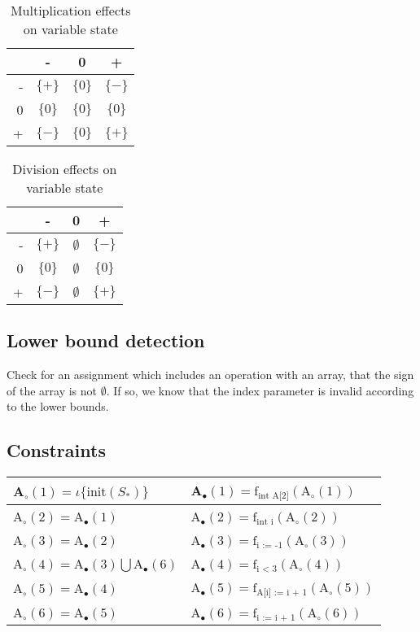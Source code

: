 \begin{table}[H]
\begin{tabular}{| r | c | c | c |}
\hline
    & -           & 0 & + \\
\hline
 -  & $\{+\}$ & $\{0\}$ & $\{-\}$ \\
\hline
 0  & $\{0\}$ & $\{0\}$ & $\{0\}$ \\
\hline
 +  & $\{-\}$ & $\{0\}$ & $\{+\}$ \\
\hline
\end{tabular}
\centering
\caption{Multiplication effects on variable state}
\end{table}

\begin{table}[H]
\begin{tabular}{| r | c | c | c |}
\hline
    & -           & 0 & + \\
\hline
 -  & $\{+\}$ & $\emptyset$ & $\{-\}$ \\
\hline
 0  & $\{0\}$ & $\emptyset$ & $\{0\}$ \\
\hline
 +  & $\{-\}$ & $\emptyset$ & $\{+\}$ \\
\hline
\end{tabular}
\centering
\caption{Division effects on variable state}
\end{table}


\subsection{Lower bound detection}
Check for an assignment which includes an operation with an array, that the sign of the array is not $\emptyset$. If so, we know that the index parameter is invalid according to the lower bounds.

\subsection{Constraints}
\begin{table}[H]
\begin{tabular}{| l | l |}
\hline
A$_\circ (1) = \iota \{\text{init}(S_*) \} $ & A$_\bullet(1) = \text{f}_{\text{int A[2]}} (\text{A}_\circ (1))$ \\
\hline
A$_\circ (2) =$A$_\bullet(1) $ & A$_\bullet(2) = \text{f}_{\text{int i}} (\text{A}_\circ (2))$ \\
\hline
A$_\circ (3) = $A$_\bullet(2)$ & A$_\bullet(3) = \text{f}_{\text{i := -1}} (\text{A}_\circ (3))$  \\
\hline
A$_\circ (4) = $A$_\bullet(3) \bigcup $A$_\bullet(6) $ & A$_\bullet(4) = \text{f}_{\text{i < 3}} (\text{A}_\circ (4))$ \\
\hline
A$_\circ (5) = $A$_\bullet(4)$ & A$_\bullet(5) = \text{f}_{\text{A[i] := i + 1}} (\text{A}_\circ (5))$ \\
\hline
A$_\circ (6) = $A$_\bullet(5)$ & A$_\bullet(6) = \text{f}_{\text{i := i + 1}} (\text{A}_\circ (6))$ \\

\hline
\end{tabular}
\centering
\end{table}

